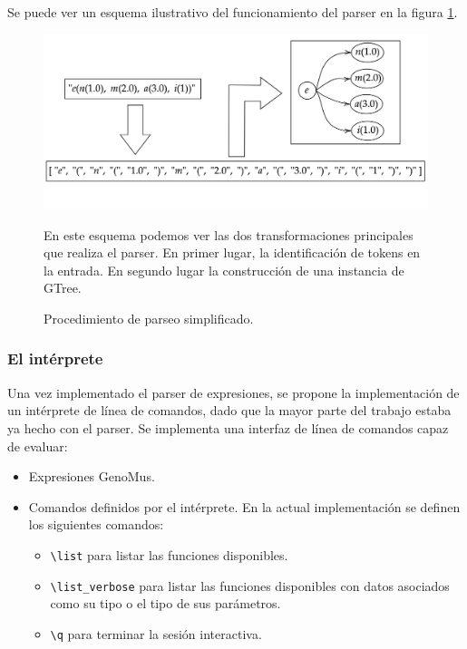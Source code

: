 Se puede ver un esquema ilustrativo del funcionamiento del parser en la figura \ref{fig:parser}. 


\begin{figure}
    \centering
    \includegraphics[width=\textwidth]{imagenes/parser.png}

    \caption{Procedimiento de parseo simplificado.} En este esquema podemos ver las dos transformaciones principales que realiza el parser. En primer lugar, la identificación de tokens en la entrada. En segundo lugar la construcción de una instancia de GTree.
    \label{fig:parser}
\end{figure}

\subsubsection{El intérprete}

Una vez implementado el parser de expresiones, se propone la implementación de un intérprete de línea de comandos, dado que la mayor parte del trabajo estaba ya hecho con el parser. Se implementa una interfaz de línea de comandos capaz de evaluar:

\begin{itemize}
    \item Expresiones GenoMus. 
    \item Comandos definidos por el intérprete. En la actual implementación se definen los siguientes comandos:
    \begin{itemize}
        \item \verb|\list| para listar las funciones disponibles.
        \item \verb|\list_verbose| para listar las funciones disponibles con datos asociados como su tipo o el tipo de sus parámetros.
        \item \verb|\q| para terminar la sesión interactiva.
    \end{itemize}
\end{itemize}

